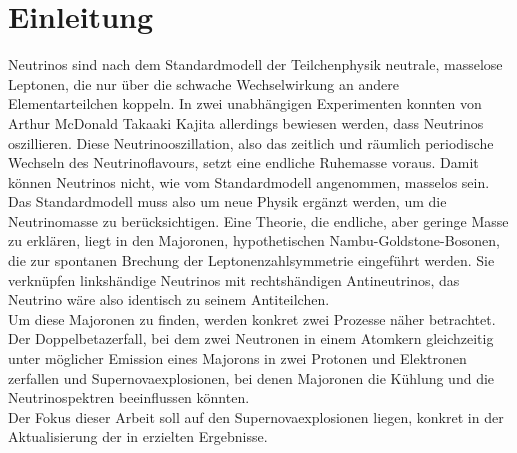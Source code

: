 \chapter{Einleitung}

Neutrinos sind nach dem Standardmodell der Teilchenphysik neutrale, masselose Leptonen, die nur über die schwache Wechselwirkung an andere Elementarteilchen koppeln.
In zwei unabhängigen Experimenten konnten von Arthur McDonald Takaaki Kajita allerdings bewiesen werden, dass Neutrinos oszillieren.
Diese Neutrinooszillation, also das zeitlich und räumlich periodische Wechseln des Neutrinoflavours, setzt eine endliche Ruhemasse voraus.
Damit können Neutrinos nicht, wie vom Standardmodell angenommen, masselos sein. \\

Das Standardmodell muss also um neue Physik ergänzt werden, um die Neutrinomasse zu berücksichtigen.
Eine Theorie, die endliche, aber geringe Masse zu erklären, liegt in den Majoronen, hypothetischen Nambu-Goldstone-Bosonen, die zur spontanen Brechung der Leptonenzahlsymmetrie eingeführt werden.
Sie verknüpfen linkshändige Neutrinos mit rechtshändigen Antineutrinos, das Neutrino wäre also identisch zu seinem Antiteilchen. \\
Um diese Majoronen zu finden, werden konkret zwei Prozesse näher betrachtet.
Der Doppelbetazerfall, bei dem zwei Neutronen in einem Atomkern gleichzeitig unter möglicher Emission eines Majorons in zwei Protonen und Elektronen zerfallen und Supernovaexplosionen, bei denen
Majoronen die Kühlung und die Neutrinospektren beeinflussen könnten. \\

Der Fokus dieser Arbeit soll auf den Supernovaexplosionen liegen, konkret in der Aktualisierung der in \cite{päspaper} erzielten Ergebnisse.


